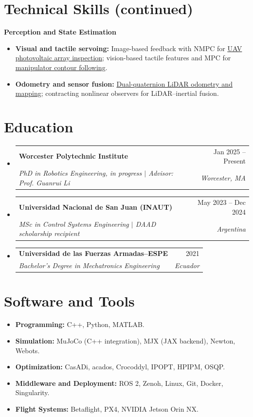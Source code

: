 \documentclass[letterpaper,11pt]{article}
\makeatletter
\newcommand{\resumeSubheading}[4]{
  \vspace{-2pt}\item
    \begin{tabular*}{0.97\textwidth}[t]{l@{\extracolsep{\fill}}r}
      \textbf{#1} & #2 \\
      \textit{\small#3} & \textit{\small #4} \\
    \end{tabular*}\vspace{-7pt}
}
\newcommand{\resumeSubHeadingListStart}{\begin{itemize}[leftmargin=0.15in, label={}, topsep=3pt]}
\newcommand{\resumeSubHeadingListEnd}{\end{itemize}}
\makeatother
\begin{document}
\section{Technical Skills (continued)}
{\small\textbf{Perception and State Estimation}\par}
\begin{itemize}[leftmargin=0.22in, itemsep=2pt, parsep=0pt, topsep=4pt]
\small
\item \textbf{Visual and tactile servoing:} Image-based feedback with NMPC for \href{https://doi.org/10.1109/LRA.2024.3360876}{UAV photovoltaic array inspection}; vision-based tactile features and MPC for \href{https://doi.org/10.1109/LRA.2026.3698362}{manipulator contour following}.
\item \textbf{Odometry and sensor fusion:} \href{https://doi.org/10.1016/j.robot.2025.105009}{Dual-quaternion LiDAR odometry and mapping}; contracting nonlinear observers for LiDAR--inertial fusion.
\end{itemize}

\section{Education}
\resumeSubHeadingListStart
\resumeSubheading{Worcester Polytechnic Institute}{Jan 2025 -- Present}
{PhD in Robotics Engineering, in progress $|$ Advisor: Prof. Guanrui Li}{Worcester, MA}
\resumeSubheading{Universidad Nacional de San Juan (INAUT)}{May 2023 -- Dec 2024}
{MSc in Control Systems Engineering $|$ DAAD scholarship recipient}{Argentina}
\resumeSubheading{Universidad de las Fuerzas Armadas--ESPE}{2021}
{Bachelor's Degree in Mechatronics Engineering}{Ecuador}
\resumeSubHeadingListEnd

\section{Software and Tools}
\begin{itemize}[leftmargin=0.15in, label={}, itemsep=2pt, parsep=0pt, topsep=3pt]
\small
\item \textbf{Programming:} C++, Python, MATLAB.
\item \textbf{Simulation:} MuJoCo (C++ integration), MJX (JAX backend), Newton, Webots.
\item \textbf{Optimization:} CasADi, acados, Crocoddyl, IPOPT, HPIPM, OSQP.
\item \textbf{Middleware and Deployment:} ROS 2, Zenoh, Linux, Git, Docker, Singularity.
\item \textbf{Flight Systems:} Betaflight, PX4, NVIDIA Jetson Orin NX.
\end{itemize}
\end{document}
